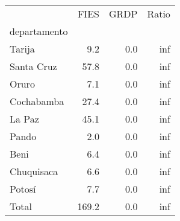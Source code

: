 \begin{tabular}{lrrr}
\toprule
{} &   FIES &  GRDP &  Ratio \\
departamento &        &       &        \\
\midrule
Tarija       &    9.2 &   0.0 &    inf \\
Santa Cruz   &   57.8 &   0.0 &    inf \\
Oruro        &    7.1 &   0.0 &    inf \\
Cochabamba   &   27.4 &   0.0 &    inf \\
La Paz       &   45.1 &   0.0 &    inf \\
Pando        &    2.0 &   0.0 &    inf \\
Beni         &    6.4 &   0.0 &    inf \\
Chuquisaca   &    6.6 &   0.0 &    inf \\
Potosí       &    7.7 &   0.0 &    inf \\
Total        &  169.2 &   0.0 &    inf \\
\bottomrule
\end{tabular}
